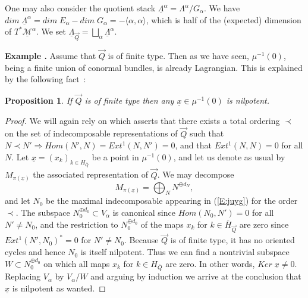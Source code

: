 \documentclass[a4paper,10pt]{amsart}
\def\vecdq{\overline{Q}}
\def\a{\alpha}
\newtheorem{prop}[theo]{Proposition}
\numberwithin{equation}{section}
\begin{document}
\vspace{.1in}

One may also consider the quotient stack $\underline{\Lambda}^{\a}=\Lambda^{\a}/G_{\a}$. We have $dim\;\underline{\Lambda}^{\a}=dim\;E_{\a}-dim\;G_{\a}=-\langle \a, \a \rangle$, which is half of the (expected) dimension of $T^* \underline{\mathcal{M}}^{\a}$. We set $\underline{\Lambda}_{\vec{Q}}=\bigsqcup_{\a} \underline{\Lambda}^{\a}$.

\vspace{.2in}

\addtocounter{theo}{1}
\noindent \textbf{Example \thetheo .} Assume that $\vec{Q}$ is of finite type. Then as we have seen, $\mu^{-1}(0)$, being a finite union of conormal bundles, is already Lagrangian. This is explained by the following fact~:


\begin{prop}\label{P:finiteLag} If $\vec{Q}$ is of finite type then any $\underline{x} \in \mu^{-1}(0)$ is nilpotent.
\end{prop}
\begin{proof} We will again rely on \cite[Lemma~3.19]{Trieste} which asserts that there exists a total ordering $\prec$ on the set of indecomposable representations of $\vec{Q}$ such that $N \prec N' \Rightarrow Hom(N',N)=Ext^1(N,N')=0$, and that $Ext^1(N,N)=0$ for all $N$. Let $\underline{x}=(x_k)_{k \in H_{\vecdq}}$ be a point in $\mu^{-1}(0)$, and let us denote as usual by $M_{\pi(\underline{x})}$ the associated representation of $\vec{Q}$. We may decompose 
\begin{equation}\label{E:juyg}
M_{\pi(\underline{x})}=\bigoplus_{N} N^{\oplus d_N},
\end{equation}
and let $N_0$ be the maximal indecomposable appearing in (\ref{E:juyg}) for the order $\prec$. The subspace $N_0^{\oplus d_0} \subset V_{\a}$ is canonical since $Hom(N_0,N')=0$ for all $N' \neq N_0$, and the restriction to $N_0^{\oplus d_0}$ of the maps $x_k$ for $k \in \overline{H}_{\vec{Q}}$ are zero since $Ext^1(N',N_0)^*=0$ for $N' \neq N_0$. Because $\vec{Q}$ is of finite type, it has no oriented cycles and hence $N_0$ is itself nilpotent. Thus we can find a nontrivial subspace $W \subset N_0^{\oplus d_0}$ on which all maps $x_k$ for $k \in H_{\vecdq}$ are zero. In other words, $Ker\;\underline{x} \neq 0$. Replacing $V_{\a}$ by $V_{\a}/W$ and arguing by induction we arrive at the conclusion that $\underline{x}$ is nilpotent as wanted.
\end{proof}

\vspace{.1in}
\end{document}
